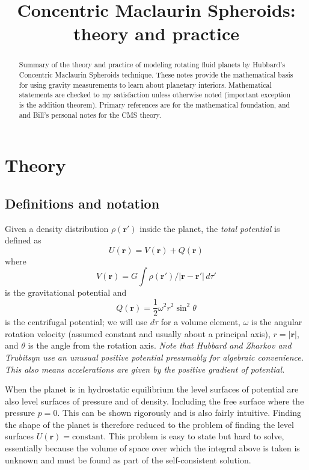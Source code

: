 \documentclass[amsmath,amsfonts,rmp,letterpaper]{revtex4}
\newcommand{\V}[1]{\mathbf{#1}} %
\newcommand{\abs}[1]{\left\vert#1\right\vert} %
\newcommand{\arr}{\V{r}}
\newcommand{\arp}{\V{r'}}
\begin{document}
\title{Concentric Maclaurin Spheroids: theory and practice}%
\author{}
\begin{abstract}
Summary of the theory and practice of modeling rotating fluid planets by Hubbard's
Concentric Maclaurin Spheroids technique. These notes provide the mathematical
basis for using gravity measurements to learn about planetary interiors.
Mathematical statements are checked to my satisfaction unless otherwise noted
(important exception is the addition theorem). Primary references are
\citep{Zharkov1978} for the mathematical foundation, and
\citep{Hubbard2012,Hubbard2013} and Bill's personal notes for the CMS theory.
\end{abstract}
\maketitle
\tableofcontents

\section{Theory\label{part:theory}}

\subsection{Definitions and notation}\label{sec:definitions}
Given a density distribution $\rho(\arp)$ inside the planet, the \emph{total
potential} is defined as
\begin{equation}
U(\arr) = V(\arr) + Q(\arr)
\end{equation}
where
\begin{equation}\label{eq:gravpot}
V(\arr) = G\int{\rho(\arp)/\abs{\arr - \arp}\,d\tau'}
\end{equation}
is the gravitational potential and
\begin{equation}\label{eq:cetrifugal_potential}
Q(\arr) = \frac{1}{2}\omega^2r^2\sin^2\theta
\end{equation}
is the centrifugal potential; we will use $d\tau$ for a volume element, $\omega$
is the angular rotation velocity (assumed constant and usually about a principal
axis), $r=\abs{\arr}$, and $\theta$ is the angle from the rotation axis.
\emph{Note that Hubbard and Zharkov and Trubitsyn use an unusual positive
potential presumably for algebraic convenience. This also means accelerations are
given by the positive gradient of potential.}

When the planet is in hydrostatic equilibrium the level surfaces of potential are
also level surfaces of pressure and of density. Including the free surface where
the pressure $p=0$. This can be shown rigorously \citep[e.g.][]{Batchelor1967} and
is also fairly intuitive. Finding the shape of the planet is therefore reduced to
the problem of finding the level surfaces $U(\arr)=\text{constant}$. This problem
is easy to state but hard to solve, essentially because the volume of space over
which the integral above is taken is unknown and must be found as part of the
self-consistent solution.
\end{document}
